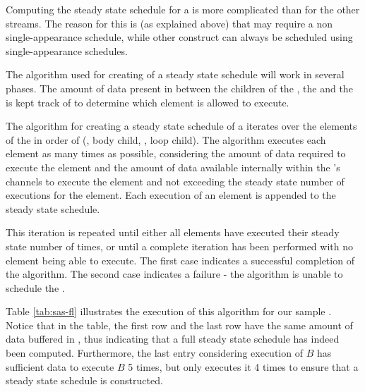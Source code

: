 Computing the steady state schedule for a {\feedbackloop} is more
complicated than for the other streams.  The reason for this is
(as explained above) that {\feedbackloops} may require a non
single-appearance schedule, while other {\StreamIt} construct can
always be scheduled using single-appearance schedules.

The algorithm used for creating of a steady state schedule will
work in several phases.  The amount of data present in {{\Channels}}
between the children of the {\feedbackloop}, the {\joiner} and the
{\splitter} is kept track of to determine which element is allowed
to execute.

The algorithm for creating a steady state schedule of a
{\feedbackloop} iterates over the elements of the {\feedbackloop} in
order of ({\joiner}, body child, {\splitter}, loop child).  The
algorithm executes each element as many times as possible,
considering the amount of data required to execute the element and
the amount of data available internally within the {\feedbackloop}'s
channels to execute the element and not exceeding the steady state
number of executions for the element.  Each execution of an
element is appended to the steady state schedule.

This iteration is repeated until either all elements have executed
their steady state number of times, or until a complete iteration
has been performed with no element being able to execute. The
first case indicates a successful completion of the algorithm. The
second case indicates a failure - the algorithm is unable to
schedule the {\feedbackloop}.

Table \ref{tab:sas-fl} illustrates the execution of this algorithm
for our sample {\feedbackloop}. Notice that in the table, the first
row and the last row have the same amount of data buffered in
{{\Channels}}, thus indicating that a full steady state schedule has
indeed been computed. Furthermore, the last entry considering
execution of $B$ has sufficient data to execute $B$ 5 times, but
only executes it 4 times to ensure that a steady state schedule is
constructed.

